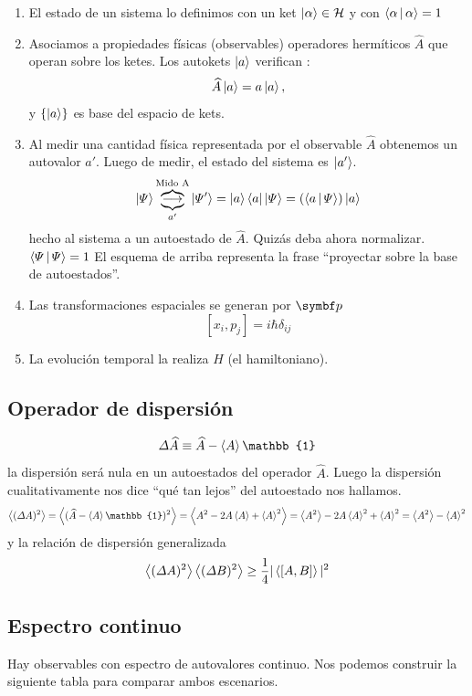 \documentclass[10pt,oneside]{CBFT_book}
\begin{document}
\begin{enumerate}
 \item El estado de un sistema lo definimos con un ket $\Ket{\alpha} \in \mathcal{H}$ y con $\Braket{\alpha|\alpha}=1$
 \item Asociamos a propiedades físicas (observables) operadores hermíticos $\widehat{A}$ que operan sobre los ketes. 
	Los autokets $\Ket{a}$ verifican :
\[
	\widehat{A}\Ket{a} = a \Ket{a}, 
\]
y $\{ \Ket{a} \}$ es base del espacio de kets.
 \item Al medir una cantidad física representada por el observable $\widehat{A}$ obtenemos un autovalor $a'$.
 Luego de medir, el estado del sistema es $\Ket{a'}$.
 \[
	\Ket{\Psi} \overbrace{\underbrace{\longrightarrow}_{a'}}^{\text{Mido A}} \Ket{\Psi'} =
	\Ket{a}\Bra{a}\Ket{\Psi} =(\Braket{a|\Psi})\Ket{a}
 \]
 hecho al sistema a un autoestado de $\widehat{A}$. Quizás deba ahora normalizar. $\Braket{\Psi|\Psi}=1$
 El esquema de arriba representa la frase ``proyectar sobre la base de autoestados''.
 \item Las transformaciones espaciales se generan por $\vb{p}$
 \[	
	[x_i,p_j] = i\hbar\delta_{ij}
 \]
 \item La evolución temporal la realiza $H$ (el hamiltoniano).
\end{enumerate}


\subsection{Operador de dispersión}

\[
	\Delta \widehat{A} \equiv \widehat{A} - \Braket{A}\mathbb{1}
\]
la dispersión será nula en un autoestados del operador $\widehat{A}$. Luego la dispersión cualitativamente nos dice 
``qué tan lejos'' del autoestado nos hallamos.
\[
	\Braket{(\Delta A)^2} = \Braket{(\widehat{A} - \Braket{A}\mathbb{1})^2} =
	\Braket{ A^2 - 2A\Braket{A} + \Braket{A}^2 } = \Braket{A^2} - 2A\Braket{A}^2 + \Braket{A}^2 =
	\Braket{A^2} - \Braket{A}^2
\]
y la relación de dispersión generalizada
\[
	\Braket{(\Delta A)^2} \Braket{(\Delta B)^2} \geq \frac{1}{4}|\Braket{[ A,B ]}|^2
\]

\subsection{Espectro continuo}

Hay observables con espectro de autovalores continuo.
Nos podemos construir la siguiente tabla para comparar ambos escenarios.
\end{document}
